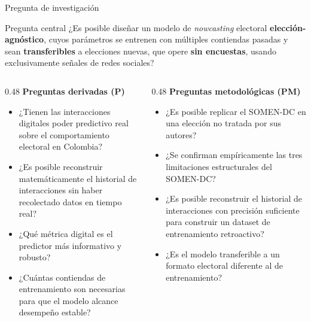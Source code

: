 \begin{frame}{Pregunta de investigación}
  \begin{block}{Pregunta central}
    ¿Es posible diseñar un modelo de \textit{nowcasting} electoral \textbf{elección-agnóstico},
    cuyos parámetros se entrenen con múltiples contiendas pasadas y sean
    \textbf{transferibles} a elecciones nuevas, que opere \textbf{sin encuestas},
    usando exclusivamente señales de redes sociales?
  \end{block}

  \vspace{0.25em}
  \begin{columns}[T]
    \begin{column}{0.48\textwidth}
      {\small\textbf{\color{barBlue}Preguntas derivadas (P)}}
      \begin{itemize}\small
        \item[\textbf{P1}] ¿Tienen las interacciones digitales poder predictivo real sobre el comportamiento electoral en Colombia?
        \item[\textbf{P2}] ¿Es posible reconstruir matemáticamente el historial de interacciones sin haber recolectado datos en tiempo real?
        \item[\textbf{P3}] ¿Qué métrica digital es el predictor más informativo y robusto?
        \item[\textbf{P4}] ¿Cuántas contiendas de entrenamiento son necesarias para que el modelo alcance desempeño estable?
      \end{itemize}
    \end{column}
    \begin{column}{0.48\textwidth}
      {\small\textbf{\color{barBlue}Preguntas metodológicas (PM)}}
      \begin{itemize}\small
        \item[\textbf{PM1}] ¿Es posible replicar el SOMEN-DC en una elección no tratada por sus autores?
        \item[\textbf{PM2}] ¿Se confirman empíricamente las tres limitaciones estructurales del SOMEN-DC?
        \item[\textbf{PM3}] ¿Es posible reconstruir el historial de interacciones con precisión suficiente para construir un dataset de entrenamiento retroactivo?
        \item[\textbf{PM4}] ¿Es el modelo transferible a un formato electoral diferente al de entrenamiento?
      \end{itemize}
    \end{column}
  \end{columns}
\end{frame}

